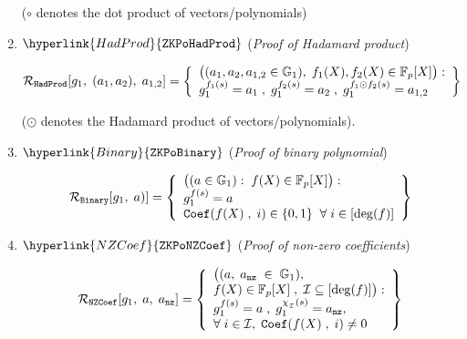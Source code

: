 \documentclass[11pt, lettersize, notitlepage, leqno, footskip=0.6cm]{article}
\newcommand{\bFp}{\mathbb{F}_p}
\newcommand{\slim}{\sum\limits}
\newcommand{\mc}{\mathcal}
\newcommand{\mb}{\mathbb}
\newcommand{\sub}{\subseteq}
\newcommand{\vs}{\vspace{-0.15cm}}
\newcommand{\noin}{\noindent}
\numberwithin{equation}{section}
\begin{document}
\begin{enumerate}[wide, labelwidth=!, labelindent=0pt, itemsep=-0.2ex]
\noin ($\circ$ denotes the dot product of vectors/polynomials)

\item $\hyperlink{HadProd}{\tt{ZKPoHadProd}}$ (\textit{Proof of Hadamard product}) \vspace{-3mm}

$$\mc{R}_{\tt{HadProd}}[g_1,\;(a_1,a_2),\; a_{1,2}] = \left\{\begin{array}{l} \big((a_1,a_2, a_{1,2}\in\mb{G}_1),\; f_1(X),f_2(X)\in \bFp[X]\big):\\ g_1^{f_1(s)} = a_1\;,\; g_1^{f_2(s)} = a_2 \;,\; g_1^{f_1\odot f_2(s)} = a_{1,2}\end{array} \right\} \vs $$

\noin ($\odot$ denotes the Hadamard product of vectors/polynomials).

\item $\hyperlink{Binary}{\tt{ZKPoBinary}}$ (\textit{Proof of binary polynomial}) \vspace{-3mm}

$$\mc{R}_{\tt{Binary}}[g_1,\;a)] = \left\{\begin{array}{l} \big( (a\in\mb{G}_1):\;
f(X)\in \bFp[X]\big): \\
g_1^{f(s)} = a\\ 
{\tt{Coef}}(f(X)\;,\; i)\in\{0,1\} \;\;\forall\;i\in [\deg(f)]
\end{array}\right\} \vs $$




\item $\hyperlink{NZCoef}{\tt{ZKPoNZCoef}}$ (\textit{Proof of non-zero coefficients}) \vspace{-3mm}

\begin{comment}$$\mc{R}_{\tt{NZCoef}}[g_1,\;a,\;a_{\deg}] = \left\{\begin{array}{l} \big((a, a_{\deg}\in\mb{G}_1),\\
f(X)\in \bFp\;,\;(c_0,\cdots,c_{\deg(f)})\in (\bFp^*)^{\deg(f)+1} \big):\\
g_1^{f(s)} = a\;,\; g_1^{\deg(f)} = a_{\deg}\;,\;f(X) = \slim_{i=0}^{\deg(f)} c_i X^i \end{array}\right\} \vs $$ \end{comment}


$$\mc{R}_{\tt{NZCoef}}[g_1,\;a,\;a_{\tt{nz}}] = \left\{\begin{array}{l} \big((a,\;a_{\tt{nz}}\;\in\;\mb{G}_1),\\
f(X)\in \bFp[X]\;,\; \mc{I}\sub [ \deg(f)]\big):\\
g_1^{f(s)} = a\;,\;g_1^{\chi_{_\mc{I}}(s)} =a_{\tt{nz}},\\
\forall\;i\in \mc{I},\; {\tt{Coef}}(f(X)\;,\; i)\neq 0 \end{array}\right\}  $$



\end{enumerate}
\end{document}
